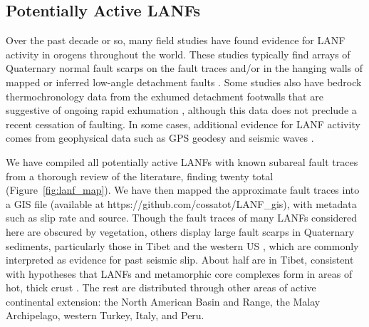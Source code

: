 \documentclass[draft,grl]{AGUTeX}
\begin{document}
\begin{article}
\section{Potentially Active LANFs}

Over the past decade or so, many field studies have found evidence for LANF
activity in orogens throughout the world. These studies typically find arrays
of Quaternary normal fault scarps on the fault traces and/or in the hanging
walls of mapped or inferred low-angle detachment faults \citep [e.g.,]
[]{axen1999baja}. Some studies also have bedrock thermochronology data from the
exhumed detachment footwalls that are suggestive of ongoing rapid exhumation
\citep [e.g.,][]{sundell2013lunggar}, although this data does not preclude
a recent cessation of faulting. In some cases, additional evidence for LANF
activity comes from geophysical data such as GPS geodesy \citep [e.g.,]
[]{hreinsdottir2009altotib} and seismic waves \citep
[e.g.,][]{doser1987ancash}.

We have compiled all potentially active LANFs with known subareal fault traces
from a thorough review of the literature, finding twenty total
(Figure~\ref{fig:lanf_map}).  We have then mapped the approximate fault traces
into a GIS file (available at https://github.com/cossatot/LANF\_gis), with
metadata such as slip rate and source. Though the fault traces of many LANFs
considered here are obscured by vegetation, others display large fault scarps
in Quaternary sediments, particularly those in Tibet
\citep[e.g.,][]{styron2013slr, kapp2005nqtl} and the western US
\citep[e.g.,][]{axen1999baja, hayman2003dv}, which are commonly interpreted as
evidence for past seismic slip.  About half are in Tibet, consistent with
hypotheses that LANFs and metamorphic core complexes form in areas of hot,
thick crust \citep [e.g.,][]{buck1991mcc}.  The rest are distributed through
other areas of active continental extension: the North American Basin and
Range, the Malay Archipelago, western Turkey, Italy, and Peru. 


\end{article}
\end{document}
